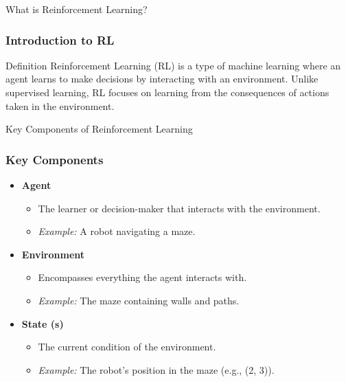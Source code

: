 \documentclass[aspectratio=169]{beamer}
\begin{document}
\begin{frame}[fragile]{What is Reinforcement Learning?}
    \frametitle{Introduction to RL}
    \begin{block}{Definition}
        Reinforcement Learning (RL) is a type of machine learning where an agent learns to make decisions by interacting with an environment. Unlike supervised learning, RL focuses on learning from the consequences of actions taken in the environment.
    \end{block}
\end{frame}

\begin{frame}[fragile]{Key Components of Reinforcement Learning}
    \frametitle{Key Components}
    \begin{itemize}
        \item \textbf{Agent}
            \begin{itemize}
                \item The learner or decision-maker that interacts with the environment.
                \item \textit{Example:} A robot navigating a maze.
            \end{itemize}
        \item \textbf{Environment}
            \begin{itemize}
                \item Encompasses everything the agent interacts with.
                \item \textit{Example:} The maze containing walls and paths.
            \end{itemize}
        \item \textbf{State (s)}
            \begin{itemize}
                \item The current condition of the environment.
                \item \textit{Example:} The robot's position in the maze (e.g., (2, 3)).
            \end{itemize}
    \end{itemize}
\end{frame}
\end{document}
